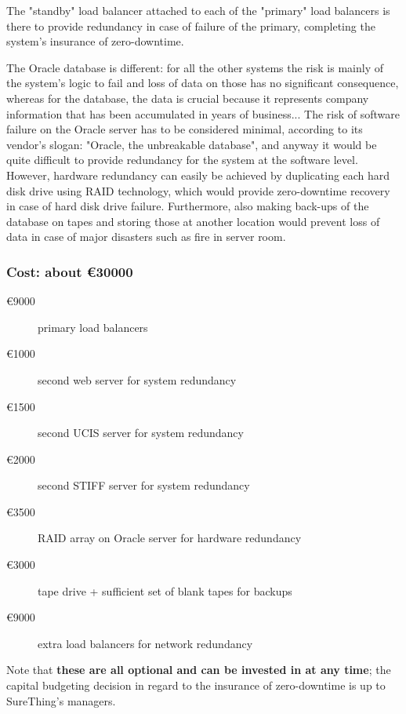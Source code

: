 The "standby" load balancer attached to each of the "primary" load balancers
is there to provide redundancy in case of failure of the primary, completing
the system's insurance of zero-downtime.

The Oracle database is different: for all the other systems the risk is mainly
of the system's logic to fail and loss of data on those has no significant
consequence, whereas for the database, the data is crucial because it represents
company information that has been accumulated in years of business... The risk
of software failure on the Oracle server has to be considered minimal, according
to its vendor's slogan: "Oracle, the unbreakable database", and anyway it would
be quite difficult to provide redundancy for the system at the software level.
However, hardware redundancy can easily be achieved by duplicating each hard disk
drive using RAID technology, which would provide zero-downtime recovery in case
of hard disk drive failure. Furthermore, also making back-ups of the database on
tapes and storing those at another location would prevent loss of data in case
of major disasters such as fire in server room.

\subsubsection{Cost: about \euro30000}

\begin{description}
\item[\euro9000] primary load balancers
\item[\euro1000] second web server for system redundancy
\item[\euro1500] second UCIS server for system redundancy
\item[\euro2000] second STIFF server for system redundancy
\item[\euro3500] RAID array on Oracle server for hardware redundancy
\item[\euro3000] tape drive + sufficient set of blank tapes for backups
\item[\euro9000] extra load balancers for network redundancy
\end{description}

Note that \textbf{these are all optional and can be invested in at any time};
the capital budgeting decision in regard to the insurance of zero-downtime is
up to SureThing's managers.